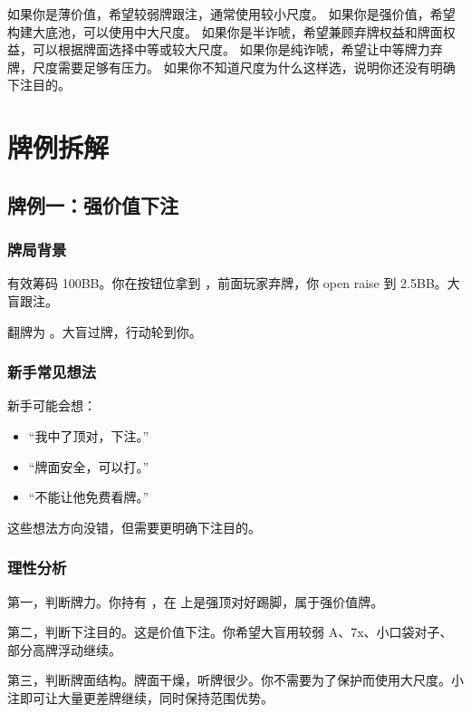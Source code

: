 如果你是薄价值，希望较弱牌跟注，通常使用较小尺度。
如果你是强价值，希望构建大底池，可以使用中大尺度。
如果你是半诈唬，希望兼顾弃牌权益和牌面权益，可以根据牌面选择中等或较大尺度。
如果你是纯诈唬，希望让中等牌力弃牌，尺度需要足够有压力。
如果你不知道尺度为什么这样选，说明你还没有明确下注目的。

\section{牌例拆解}

\subsection{牌例一：强价值下注}

\subsubsection*{牌局背景}

有效筹码 100BB。你在按钮位拿到 ，前面玩家弃牌，你 open raise 到 2.5BB。大盲跟注。

翻牌为 。大盲过牌，行动轮到你。

\subsubsection*{新手常见想法}

新手可能会想：

\begin{itemize}
\item “我中了顶对，下注。”
\item “牌面安全，可以打。”
\item “不能让他免费看牌。”
\end{itemize}

这些想法方向没错，但需要更明确下注目的。

\subsubsection*{理性分析}

第一，判断牌力。你持有 ，在  上是强顶对好踢脚，属于强价值牌。

第二，判断下注目的。这是价值下注。你希望大盲用较弱 A、7x、小口袋对子、部分高牌浮动继续。

第三，判断牌面结构。牌面干燥，听牌很少。你不需要为了保护而使用大尺度。小注即可让大量更差牌继续，同时保持范围优势。

